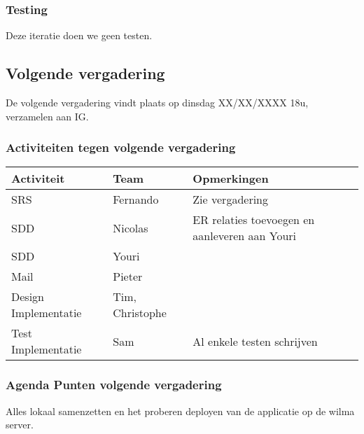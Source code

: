 \subsubsection{Testing}
Deze iteratie doen we geen testen. 


\subsection{Volgende vergadering}
De volgende vergadering vindt plaats op dinsdag XX/XX/XXXX 18u, verzamelen aan IG.
\subsubsection{Activiteiten tegen volgende vergadering} \label{sec:TODOActiviteiten}
\begin{table} [H]
	\centering
	\begin{tabular} {l|l|l}
		\textbf{Activiteit} & \textbf{Team} & \textbf{Opmerkingen} \\
		\hline
		SRS & Fernando & Zie vergadering \\
		SDD & Nicolas & ER relaties toevoegen en aanleveren aan Youri \\
		SDD & Youri & \\
		Mail & Pieter & \\
		Design Implementatie & Tim, Christophe & \\
		Test Implementatie & Sam & Al enkele testen schrijven \\
	\end{tabular}
\end{table}

\subsubsection{Agenda Punten volgende vergadering}
Alles lokaal samenzetten en het proberen deployen van de applicatie op de wilma server. 
